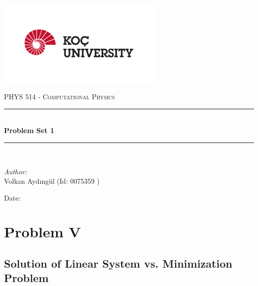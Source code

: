 \documentclass[letterpaper,12pt]{article}
\newcommand{\reporttitle}{Problem Set 1}
\newcommand{\reportauthor}{ Volkan Aydıngül (Id: 0075359 )\\
                            }
\begin{document}
\begin{titlepage}
\newcommand{\HRule}{\rule{\linewidth}{0.5mm}}
\begin{center} %
\includegraphics[width = 8cm]{figures/koc_logo.png}

\textsc{\Large PHYS 514 - Computational Physics}\\[1.5cm] 
\HRule \\[0.6cm]
{ \huge \bfseries \reporttitle}\\ %
\HRule \\[1.5cm]
\end{center}
\vspace{2cm}
\begin{flushleft} \large
\textit{Author:}\\
\reportauthor%
\end{flushleft}
\vspace{2cm}
\makeatletter
Date: \@date 
\vfill %
\makeatother
\end{titlepage}




\tableofcontents
\newpage






\section{Problem V}
\subsection{Solution of Linear System vs. Minimization Problem}
\end{document}
